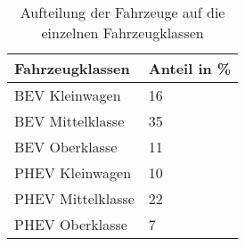 {
\renewcommand{\arraystretch}{1.2}%
\begin{table}[H]
	\begin{center}
		\caption{Aufteilung der Fahrzeuge auf die einzelnen Fahrzeugklassen}
		\begin{tabu} to 0.7\textwidth {X[1] X[1, r]}
			\hline
			Fahrzeugklassen   & Anteil in \si{\percent}  \\ \hline
			BEV Kleinwagen    & \num{16}                 \\
			BEV Mittelklasse  & \num{35}                 \\
			BEV Oberklasse    & \num{11}                 \\
			PHEV Kleinwagen   & \num{10}                 \\
			PHEV Mittelklasse & \num{22}                 \\
			PHEV Oberklasse   & \num{7}                  \\ \hline
		\end{tabu}
		\label{tab:CarSplit}
	\end{center}
	\vspace{-3mm}%
\end{table}
}